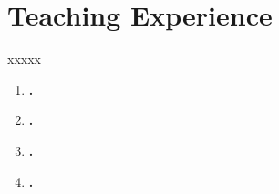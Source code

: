 \documentclass[12pt,a4paper,sans]{moderncv} %
\begin{document}
\section{Teaching Experience}
xxxxx
\begin{enumerate}

\item \textbf{.} \par 
\item \textbf{.}\par 
\item \textbf{.} \par 
\item \textbf{.} \par 
\end{enumerate}
\end{document}
